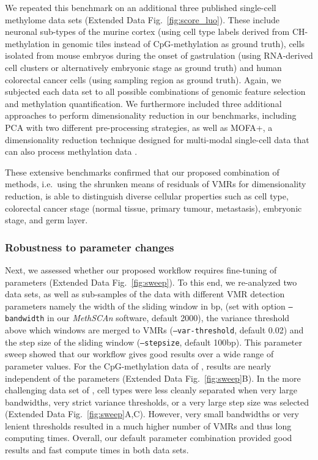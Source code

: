 \documentclass[10pt]{article}
\begin{document}
We repeated this benchmark on an additional three published single-cell methylome data sets (Extended Data Fig.~\ref{fig:score_luo}).
These include neuronal sub-types of the murine cortex \citep{luo2017single} (using cell type labels derived from CH-methylation in genomic tiles instead of CpG-methylation as ground truth), cells isolated from mouse embryos during the onset of gastrulation \citep{argelaguet2019gastru} (using RNA-derived cell clusters or alternatively embryonic stage as ground truth) and human colorectal cancer cells \citep{bian2018single} (using sampling region as ground truth).
Again, we subjected each data set to all possible combinations of genomic feature selection and methylation quantification.
We furthermore included three additional approaches to perform dimensionality reduction in our benchmarks, including PCA with two different pre-processing strategies, as well as MOFA+, a dimensionality reduction technique designed for multi-modal single-cell data that can also process methylation data \citep{argelaguet2020mofa}.


These extensive benchmarks confirmed that our proposed combination of methods, i.e.\ using the shrunken means of residuals of VMRs for dimensionality reduction, is able to distinguish diverse cellular properties such as cell type, colorectal cancer stage (normal tissue, primary tumour, metastasis), embryonic stage, and germ layer.



\subsubsection*{Robustness to parameter changes}

Next, we assessed whether our proposed workflow requires fine-tuning of parameters (Extended Data Fig.~\ref{fig:sweep}).
To this end, we re-analyzed two data sets, as well as sub-samples of the data with different VMR detection parameters namely the width of the sliding window in bp, (set with option \texttt{--bandwidth} in our \textit{MethSCAn} software, default 2000), the variance threshold above which windows are merged to VMRs (\texttt{--var-threshold}, default 0.02) and the step size of the sliding window (\texttt{--stepsize}, default 100bp).
This parameter sweep showed that our workflow gives good results over a wide range of parameter values.
For the CpG-methylation data of \citet{luo2017single}, results are nearly independent of the parameters (Extended Data Fig.~\ref{fig:sweep}B).
In the more challenging data set of \citet{kremer_scnmt}, cell types were less cleanly separated when very large bandwidths, very strict variance thresholds, or a very large step size was selected (Extended Data Fig.~\ref{fig:sweep}A,C).
However, very small bandwidths or very lenient thresholds resulted in a much higher number of VMRs and thus long computing times.
Overall, our default parameter combination provided good results and fast compute times in both data sets.
\end{document}

